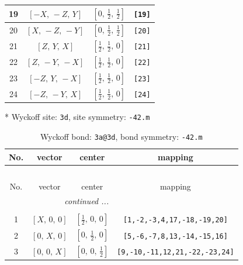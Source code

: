 \documentclass[fleqn,8pt]{jsarticle}
\begin{document}
\begin{longtable}{cccc}
19 & $\left[ - X,\, - Z,\, Y \right]$ & $\left[ 0,\, \frac{1}{2},\, \frac{1}{2} \right]$ & {\tt [19]} \\ \hline
20 & $\left[ X,\, - Z,\, - Y \right]$ & $\left[ 0,\, \frac{1}{2},\, \frac{1}{2} \right]$ & {\tt [20]} \\ \hline
21 & $\left[ Z,\, Y,\, X \right]$ & $\left[ \frac{1}{2},\, \frac{1}{2},\, 0 \right]$ & {\tt [21]} \\ \hline
22 & $\left[ Z,\, - Y,\, - X \right]$ & $\left[ \frac{1}{2},\, \frac{1}{2},\, 0 \right]$ & {\tt [22]} \\ \hline
23 & $\left[ - Z,\, Y,\, - X \right]$ & $\left[ \frac{1}{2},\, \frac{1}{2},\, 0 \right]$ & {\tt [23]} \\ \hline
24 & $\left[ - Z,\, - Y,\, X \right]$ & $\left[ \frac{1}{2},\, \frac{1}{2},\, 0 \right]$ & {\tt [24]} \\
\end{longtable}
* Wyckoff site: {\tt 3d}, site symmetry: {\tt -42.m}
\renewcommand{\arraystretch}{1.2}
\begin{longtable}{cccc}
\caption{Wyckoff bond: {\tt 3a@3d}, bond symmetry: {\tt -42.m}}
 \\
 \hline \hline
No. & vector & center & mapping \\ \hline \endfirsthead

\multicolumn{3}{l}{\tablename\ \thetable{}} \\
 \hline \hline
No. & vector & center & mapping \\ \hline \endhead

 \hline \hline
\multicolumn{3}{r}{\footnotesize\it continued ...} \\ \endfoot

 \hline \hline
\multicolumn{3}{r}{} \\ \endlastfoot

1 & $\left[ X,\, 0,\, 0 \right]$ & $\left[ \frac{1}{2},\, 0,\, 0 \right]$ & {\tt [1,-2,-3,4,17,-18,-19,20]} \\ \hline
2 & $\left[ 0,\, X,\, 0 \right]$ & $\left[ 0,\, \frac{1}{2},\, 0 \right]$ & {\tt [5,-6,-7,8,13,-14,-15,16]} \\ \hline
3 & $\left[ 0,\, 0,\, X \right]$ & $\left[ 0,\, 0,\, \frac{1}{2} \right]$ & {\tt [9,-10,-11,12,21,-22,-23,24]} \\
\end{longtable}
\renewcommand{\arraystretch}{1.2}
\end{document}
